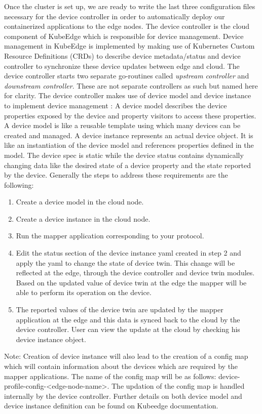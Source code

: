 Once the cluster is set up, we are ready to write the last three configuration files necessary for the device controller in order to automatically deploy our containerized applications to the edge nodes.
The device controller is the cloud component of KubeEdge which is responsible for device management. Device management in KubeEdge is implemented by making use of Kubernetes Custom Resource Definitions (CRDs) to describe device metadata/status and device controller to synchronize these device updates between edge and cloud. The device controller starts two separate go-routines called \textit{upstream controller} and \textit{downstream controller}. These are not separate controllers as such but named here for clarity.
The device controller makes use of device model and device instance to implement device management :
A device model describes the device properties exposed by the device and property visitors to access these properties. A device model is like a reusable template using which many devices can be created and managed. A device instance represents an actual device object. It is like an instantiation of the device model and references properties defined in the model. The device spec is static while the device status contains dynamically changing data like the desired state of a device property and the state reported by the device.
Generally the steps to address these requirements are the following:
\begin{enumerate}
	\item Create a device model in the cloud node.
	\item Create a device instance in the cloud node.
	\item Run the mapper application corresponding to your protocol.
	\item Edit the status section of the device instance yaml created in step 2 and apply the yaml to change the state of device twin. This change will be reflected at the edge, through the device controller and device twin modules. Based on the updated value of device twin at the edge the mapper will be able to perform its operation on the device.
	\item The reported values of the device twin are updated by the mapper application at the edge and this data is synced back to the cloud by the device controller. User can view the update at the cloud by checking his device instance object.
\end{enumerate}

Note: Creation of device instance will also lead to the creation of a config map which will contain information about the devices which are required by the mapper applications. The name of the config map will be as follows: device-profile-config-\textless edge-node-name\textgreater. The updation of the config map is handled internally by the device controller.
Further details on both device model and device instance definition can be found on Kubeedge documentation.

